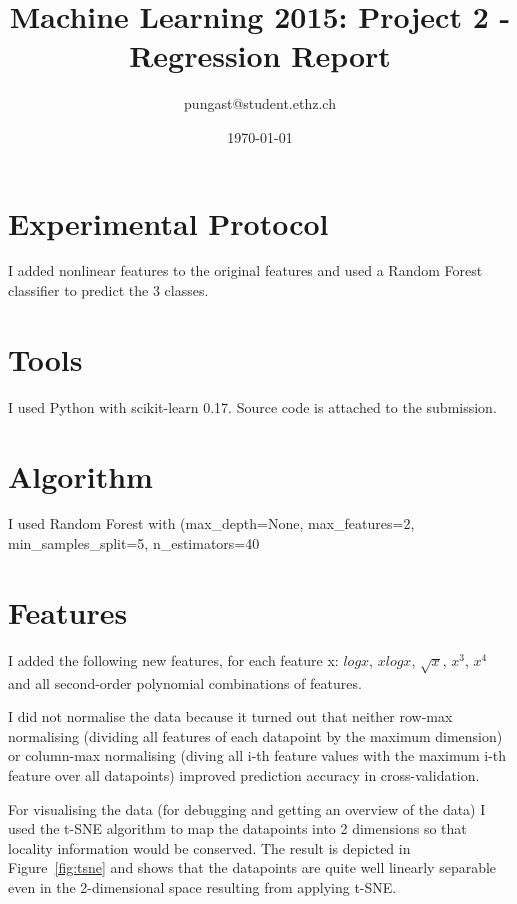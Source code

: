 \documentclass[a4paper, 11pt]{article}
\title{Machine Learning 2015: Project 2 - Regression Report}
\author{pungast@student.ethz.ch\\}
\date{\today}
\begin{document}
\maketitle

\section*{Experimental Protocol}
I added nonlinear features to the original features and used a Random Forest classifier to predict the 3 classes.

\section{Tools}
I used Python with scikit-learn 0.17. Source code is attached to the submission.

\section{Algorithm}
I used Random Forest with (max_depth=None, max_features=2, min_samples_split=5, n_estimators=40

\section{Features}
I added the following new features, for each feature x: $log x$, $x log x$, $\sqrt{x}$, $x^3$, $x^4$ and all second-order polynomial combinations of features.

I did not normalise the data because it turned out that neither row-max normalising (dividing all features of each datapoint by the maximum dimension) or column-max normalising (diving all i-th feature values with the maximum i-th feature over all datapoints) improved prediction accuracy in cross-validation.

For visualising the data (for debugging and getting an overview of the data) I used the t-SNE algorithm to map the datapoints into 2 dimensions so that locality information would be conserved. The result is depicted in Figure~\ref{fig:tsne} and shows that the datapoints are quite well linearly separable even in the 2-dimensional space resulting from applying t-SNE.
\end{document}
